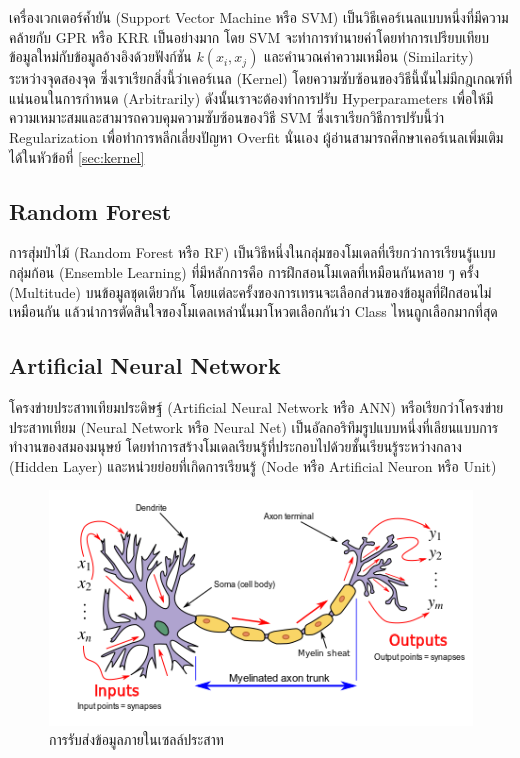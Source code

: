 เครื่องเวกเตอร์ค้ำยัน (Support Vector Machine หรือ SVM) เป็นวิธีเคอร์เนลแบบหนึ่งที่มีความคล้ายกับ GPR หรือ KRR เป็นอย่างมาก โดย SVM 
จะทำการทำนายค่าโดยทำการเปรียบเทียบข้อมูลใหม่กับข้อมูลอ้างอิงด้วยฟังก์ชัน $k(x_{i},x_{j})$ และคำนวณค่าความเหมือน (Similarity) 
ระหว่างจุดสองจุด ซึ่งเราเรียกสิ่งนี้ว่าเคอร์เนล (Kernel) โดยความซับซ้อนของวิธีนี้นั้นไม่มีกฎเกณฑ์ที่แน่นอนในการกำหนด (Arbitrarily)
ดังนั้นเราจะต้องทำการปรับ Hyperparameters เพื่อให้มีความเหมาะสมและสามารถควบคุมความซับซ้อนของวิธี SVM ซึ่งเราเรียกวิธีการปรับนี้ว่า 
Regularization เพื่อทำการหลีกเลี่ยงปัญหา Overfit นั่นเอง ผู้อ่านสามารถศึกษาเคอร์เนลเพิ่มเติมได้ในหัวข้อที่ \ref{sec:kernel}

\subsection{Random Forest}
\label{ssec:rs}

การสุ่มป่าไม้ (Random Forest หรือ RF) เป็นวิธีหนึ่งในกลุ่มของโมเดลที่เรียกว่าการเรียนรู้แบบกลุ่มก้อน (Ensemble Learning) ที่มีหลักการคือ%
การฝึกสอนโมเดลที่เหมือนกันหลาย ๆ ครั้ง (Multitude) บนข้อมูลชุดเดียวกัน โดยแต่ละครั้งของการเทรนจะเลือกส่วนของข้อมูลที่ฝึกสอนไม่เหมือนกัน 
แล้วนำการตัดสินใจของโมเดลเหล่านั้นมาโหวตเลือกกันว่า Class ไหนถูกเลือกมากที่สุด\autocite{breiman2001,quinlan1986}

\subsection{Artificial Neural Network}
\label{ssec:ann}

โครงข่ายประสาทเทียมประดิษฐ์ (Artificial Neural Network หรือ ANN) หรือเรียกว่าโครงข่ายประสาทเทียม (Neural Network หรือ 
Neural Net) เป็นอัลกอริทึมรูปแบบหนึ่งที่เลียนแบบการทำงานของสมองมนุษย์ โดยทำการสร้างโมเดลเรียนรู้ที่ประกอบไปด้วยชั้นเรียนรู้ระหว่างกลาง 
(Hidden Layer) และหน่วยย่อยที่เกิดการเรียนรู้ (Node หรือ Artificial Neuron หรือ Unit)

\begin{figure}[htbp]
    \centering
    \includegraphics[width=0.9\linewidth]{fig/neuron.png}
    \caption{การรับส่งข้อมูลภายในเซลล์ประสาท}
    \label{fig:neuron}
\end{figure}

